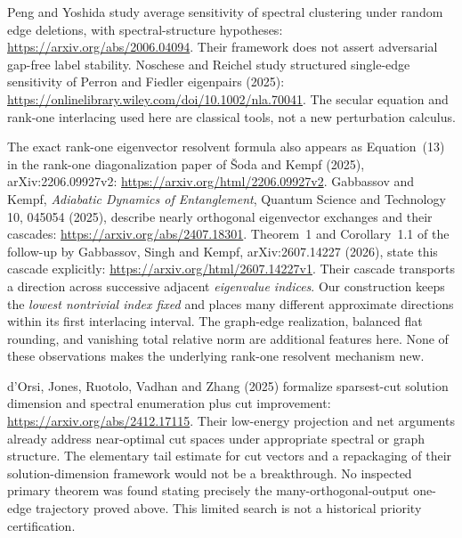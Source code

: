 \documentclass[11pt]{article}
\begin{document}
Peng and Yoshida study average sensitivity of spectral clustering
under random edge deletions, with spectral-structure hypotheses:
\url{https://arxiv.org/abs/2006.04094}.
Their framework does not assert adversarial gap-free label stability.
Noschese and Reichel study structured single-edge sensitivity
of Perron and Fiedler eigenpairs (2025):
\url{https://onlinelibrary.wiley.com/doi/10.1002/nla.70041}.
The secular equation and rank-one interlacing used here are classical
tools, not a new perturbation calculus.

The exact rank-one eigenvector resolvent formula also appears as
Equation~(13) in the rank-one diagonalization paper of \v{S}oda and
Kempf (2025), arXiv:2206.09927v2:
\url{https://arxiv.org/html/2206.09927v2}.
Gabbassov and Kempf, \emph{Adiabatic Dynamics of Entanglement},
Quantum Science and Technology 10, 045054 (2025), describe nearly
orthogonal eigenvector exchanges and their cascades:
\url{https://arxiv.org/abs/2407.18301}.
Theorem~1 and Corollary~1.1 of the follow-up by Gabbassov, Singh and
Kempf, arXiv:2607.14227 (2026), state this cascade explicitly:
\url{https://arxiv.org/html/2607.14227v1}.
Their cascade transports a direction across successive adjacent
\emph{eigenvalue indices}. Our construction keeps the \emph{lowest
nontrivial index fixed} and places many different approximate directions
within its first interlacing interval. The graph-edge realization,
balanced flat rounding, and vanishing total relative norm are additional
features here. None of these observations makes the underlying
rank-one resolvent mechanism new.

d'Orsi, Jones, Ruotolo, Vadhan and Zhang (2025) formalize sparsest-cut
solution dimension and spectral enumeration plus cut improvement:
\url{https://arxiv.org/abs/2412.17115}.
Their low-energy projection and net arguments already address
near-optimal cut spaces under appropriate spectral or graph structure.
The elementary tail estimate for cut vectors and a repackaging of
their solution-dimension framework would not be a breakthrough.
No inspected primary theorem was found stating precisely the
many-orthogonal-output one-edge trajectory proved above. This limited
search is not a historical priority certification.
\end{document}
